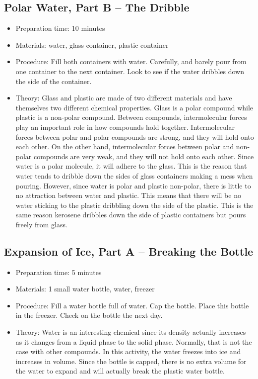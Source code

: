 \subsection{Polar Water, Part B -- The Dribble}
\begin{itemize}
\item{Preparation time: 10 minutes}
\item{Materials: water, glass container, plastic container}
\item{Procedure: Fill both containers with water. Carefully, and barely pour from one container to the next container. Look to see if the water dribbles down the side of the container.}
\item{Theory: Glass and plastic are made of two different materials and have themselves two different chemical properties. Glass is a polar compound while plastic is a non-polar compound. Between compounds, intermolecular forces play an important role in how compounds hold together. Intermolecular forces between polar and polar compounds are strong, and they will hold onto each other. On the other hand, intermolecular forces between polar and non-polar compounds are very weak, and they will not hold onto each other. Since water is a polar molecule, it will adhere to the glass. This is the reason that water tends to dribble down the sides of glass containers making a mess when pouring. However, since water is polar and plastic non-polar, there is little to no attraction between water and plastic. This means that there will be no water sticking to the plastic dribbling down the side of the plastic. This is the same reason kerosene dribbles down the side of plastic containers but pours freely from glass.}
\end{itemize}

\subsection{Expansion of Ice, Part A -- Breaking the Bottle}
\begin{itemize}
\item{Preparation time: 5 minutes}
\item{Materials: 1 small water bottle, water, freezer}
\item{Procedure: Fill a water bottle full of water. Cap the bottle. Place this bottle in the freezer. Check on the bottle the next day.}
\item{Theory: Water is an interesting chemical since its density actually increases as it changes from a liquid phase to the solid phase. Normally, that is not the case with other compounds. In this activity, the water freezes into ice and increases in volume. Since the bottle is capped, there is no extra volume for the water to expand and will actually break the plastic water bottle.}
\end{itemize}

